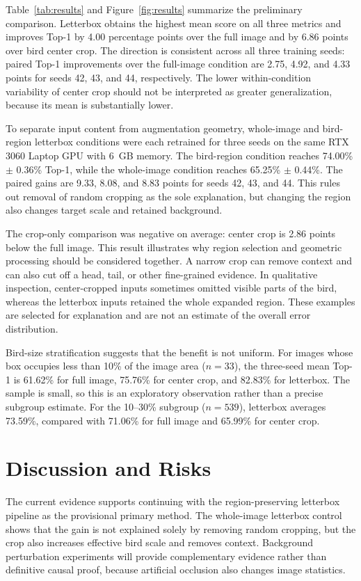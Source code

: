 \documentclass[10pt,twocolumn,letterpaper]{article}
\begin{document}
Table~\ref{tab:results} and Figure~\ref{fig:results} summarize the preliminary
comparison. Letterbox obtains the highest mean score on all three metrics and
improves Top-1 by 4.00 percentage points over the full image and by 6.86
points over bird center crop. The direction is consistent across all three
training seeds: paired Top-1 improvements over the full-image condition are
2.75, 4.92, and 4.33 points for seeds 42, 43, and 44, respectively. The lower
within-condition variability of center crop should not be interpreted as
greater generalization, because its mean is substantially lower.

To separate input content from augmentation geometry, whole-image and
bird-region letterbox conditions were each retrained for three seeds on the
same RTX 3060 Laptop GPU with 6~GB memory. The bird-region condition reaches
74.00\% $\pm$ 0.36\% Top-1, while the whole-image condition reaches 65.25\%
$\pm$ 0.44\%. The paired gains are 9.33, 8.08, and 8.83 points for seeds 42,
43, and 44. This rules out removal of random cropping as the sole explanation,
but changing the region also changes target scale and retained background.

The crop-only comparison was negative on average: center crop is 2.86 points
below the full image. This result illustrates why region selection and
geometric processing should be considered together. A narrow crop can remove
context and can also cut off a head, tail, or other fine-grained evidence. In
qualitative inspection, center-cropped inputs sometimes omitted visible parts
of the bird, whereas the letterbox inputs retained the whole expanded region.
These examples are selected for explanation and are not an estimate of the
overall error distribution.

Bird-size stratification suggests that the benefit is not uniform. For images
whose box occupies less than 10\% of the image area ($n=33$), the three-seed
mean Top-1 is 61.62\% for full image, 75.76\% for center crop, and 82.83\% for
letterbox. The sample is small, so this is an exploratory observation rather
than a precise subgroup estimate. For the 10--30\% subgroup ($n=539$),
letterbox averages 73.59\%, compared with 71.06\% for full image and 65.99\%
for center crop.

\section{Discussion and Risks}

The current evidence supports continuing with the region-preserving letterbox
pipeline as the provisional primary method. The whole-image letterbox control
shows that the gain is not explained solely by removing random cropping, but
the crop also increases effective bird scale and removes context. Background
perturbation experiments will provide complementary evidence rather than
definitive causal proof, because artificial occlusion also changes image
statistics.
\end{document}
